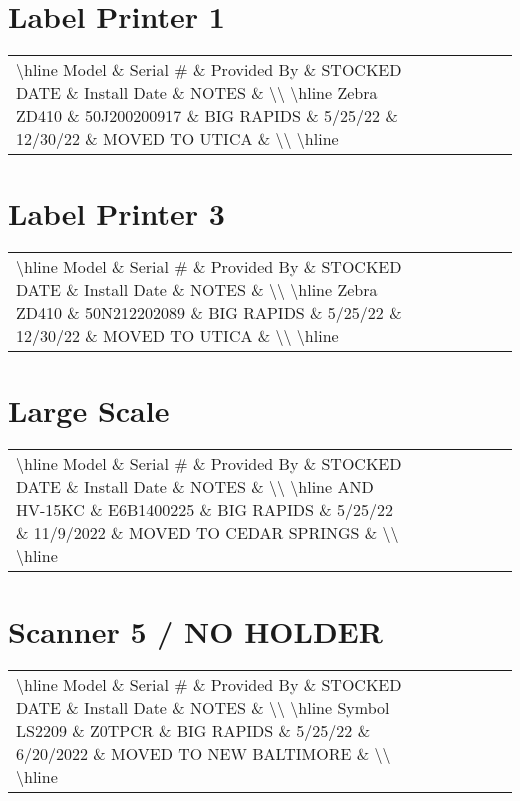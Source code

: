 \documentclass{article}%
\begin{document}
%
\section{Label Printer 1}%
\label{sec:LabelPrinter1}%
\begin{tabularx}{\textwidth}{|X|X|X|X|X|X|X|}%
\textbackslash{}hline%
Model \& Serial \# \& Provided By \& STOCKED DATE \& Install Date \& NOTES \&  \textbackslash{}\textbackslash{}%
\textbackslash{}hline%
Zebra ZD410 \& 50J200200917 \& BIG RAPIDS \& 5/25/22 \& 12/30/22 \& MOVED TO UTICA \&  \textbackslash{}\textbackslash{}%
\textbackslash{}hline%
\end{tabularx}

%
\section{Label Printer 3}%
\label{sec:LabelPrinter3}%
\begin{tabularx}{\textwidth}{|X|X|X|X|X|X|X|}%
\textbackslash{}hline%
Model \& Serial \# \& Provided By \& STOCKED DATE \& Install Date \& NOTES \&  \textbackslash{}\textbackslash{}%
\textbackslash{}hline%
Zebra ZD410 \& 50N212202089 \& BIG RAPIDS \& 5/25/22 \& 12/30/22 \& MOVED TO UTICA \&  \textbackslash{}\textbackslash{}%
\textbackslash{}hline%
\end{tabularx}

%
\section{Large Scale}%
\label{sec:LargeScale}%
\begin{tabularx}{\textwidth}{|X|X|X|X|X|X|X|}%
\textbackslash{}hline%
Model \& Serial \# \& Provided By \& STOCKED DATE \& Install Date \& NOTES \&  \textbackslash{}\textbackslash{}%
\textbackslash{}hline%
AND HV{-}15KC \& E6B1400225 \& BIG RAPIDS \& 5/25/22 \& 11/9/2022 \& MOVED TO CEDAR SPRINGS \&  \textbackslash{}\textbackslash{}%
\textbackslash{}hline%
\end{tabularx}

%
\section{Scanner 5 / NO HOLDER}%
\label{sec:Scanner5/NOHOLDER}%
\begin{tabularx}{\textwidth}{|X|X|X|X|X|X|X|}%
\textbackslash{}hline%
Model \& Serial \# \& Provided By \& STOCKED DATE \& Install Date \& NOTES \&  \textbackslash{}\textbackslash{}%
\textbackslash{}hline%
Symbol LS2209 \& Z0TPCR \& BIG RAPIDS \& 5/25/22 \& 6/20/2022 \& MOVED TO NEW BALTIMORE \&  \textbackslash{}\textbackslash{}%
\textbackslash{}hline%
\end{tabularx}
\end{document}
